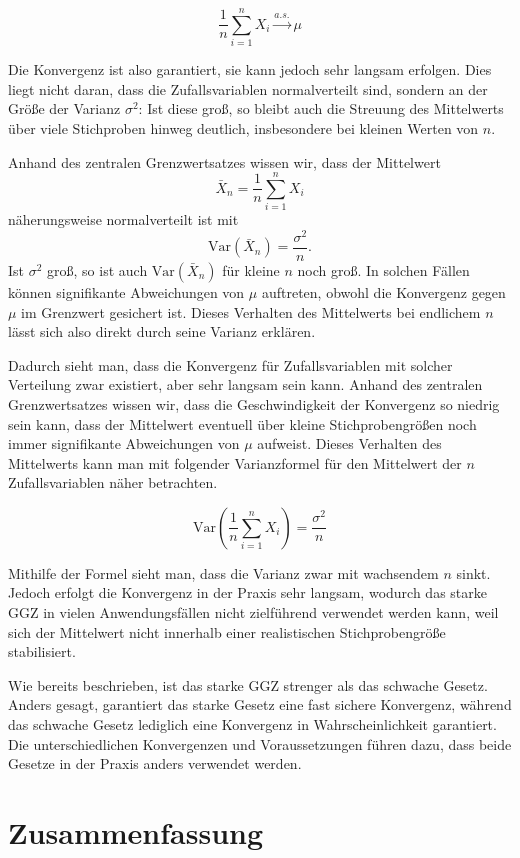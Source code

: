 \documentclass[aodsor,preprint]{imsart}
\numberwithin{equation}{section}
\theoremstyle{plain}
\begin{document}
\[
\frac{1}{n} \sum_{i=1}^n X_i \xrightarrow{a.s.} \mu
\]

Die Konvergenz ist also garantiert, sie kann jedoch sehr langsam erfolgen.
Dies liegt nicht daran, dass die Zufallsvariablen normalverteilt sind, sondern an der Größe der Varianz \(\sigma^2\): Ist diese groß, so bleibt auch die Streuung des Mittelwerts über viele Stichproben hinweg deutlich, insbesondere bei kleinen Werten von \(n\).

Anhand des zentralen Grenzwertsatzes wissen wir, dass der Mittelwert
\[
\bar{X}_n = \frac{1}{n} \sum_{i=1}^n X_i
\]
näherungsweise normalverteilt ist mit
\[
\text{Var}(\bar{X}_n) = \frac{\sigma^2}{n}.
\]
Ist \(\sigma^2\) groß, so ist auch \(\text{Var}(\bar{X}_n)\) für kleine \(n\) noch groß. In solchen Fällen können signifikante Abweichungen von \(\mu\) auftreten, obwohl die Konvergenz gegen \(\mu\) im Grenzwert gesichert ist. Dieses Verhalten des Mittelwerts bei endlichem \(n\) lässt sich also direkt durch seine Varianz erklären.


Dadurch sieht man, dass die Konvergenz für Zufallsvariablen mit solcher Verteilung zwar existiert, aber sehr langsam sein kann.
Anhand des zentralen Grenzwertsatzes wissen wir, dass die Geschwindigkeit der Konvergenz so niedrig sein kann, dass der Mittelwert eventuell über kleine Stichprobengrößen noch immer signifikante Abweichungen von \(\mu\) aufweist.
Dieses Verhalten des Mittelwerts kann man mit folgender Varianzformel für den Mittelwert der \(n\) Zufallsvariablen näher betrachten.

\[
\text{Var}\left( \frac{1}{n} \sum_{i=1}^n X_i \right) = \frac{\sigma^2}{n}
\]

Mithilfe der Formel sieht man, dass die Varianz zwar mit wachsendem \(n\) sinkt.
Jedoch erfolgt die Konvergenz in der Praxis sehr langsam, wodurch das starke GGZ in vielen Anwendungsfällen nicht zielführend verwendet werden kann, weil sich der Mittelwert nicht innerhalb einer realistischen Stichprobengröße stabilisiert.


Wie bereits beschrieben, ist das starke GGZ strenger als das schwache Gesetz.
Anders gesagt, garantiert das starke Gesetz eine fast sichere Konvergenz, während das schwache Gesetz lediglich eine Konvergenz in Wahrscheinlichkeit garantiert.
Die unterschiedlichen Konvergenzen und Voraussetzungen führen dazu, dass beide Gesetze in der Praxis anders verwendet werden.


\section{Zusammenfassung}
\label{sec:zusammenfassung}
\end{document}
